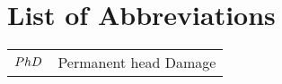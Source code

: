 \chapter*{List of Abbreviations}
\label{chap:abbrev}

\begin{center}
\begin{bfseries}
\newcommand\nomenclature[2]{#1 & #2 \\}
\begin{longtable}{@{}p{3cm}@{}p{\dimexpr\textwidth-1cm\relax}@{}}
\nomenclature{${\small PhD}$}    {Permanent head Damage}
\end{longtable}
\end{bfseries}
\end{center}
